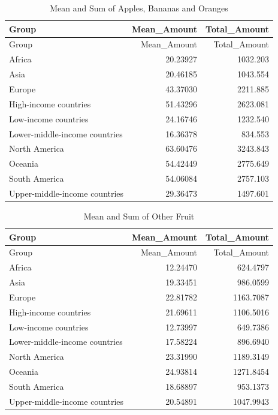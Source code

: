 \documentclass[
]{article}
\begin{document}
\begin{longtable}[]{@{}lrr@{}}
\caption{Mean and Sum of Apples, Bananas and Oranges}\tabularnewline
\toprule\noalign{}
Group & Mean\_Amount & Total\_Amount \\
\midrule\noalign{}
\endfirsthead
\toprule\noalign{}
Group & Mean\_Amount & Total\_Amount \\
\midrule\noalign{}
\endhead
\bottomrule\noalign{}
\endlastfoot
Africa & 20.23927 & 1032.203 \\
Asia & 20.46185 & 1043.554 \\
Europe & 43.37030 & 2211.885 \\
High-income countries & 51.43296 & 2623.081 \\
Low-income countries & 24.16746 & 1232.540 \\
Lower-middle-income countries & 16.36378 & 834.553 \\
North America & 63.60476 & 3243.843 \\
Oceania & 54.42449 & 2775.649 \\
South America & 54.06084 & 2757.103 \\
Upper-middle-income countries & 29.36473 & 1497.601 \\
\end{longtable}

\begin{longtable}[]{@{}lrr@{}}
\caption{Mean and Sum of Other Fruit}\tabularnewline
\toprule\noalign{}
Group & Mean\_Amount & Total\_Amount \\
\midrule\noalign{}
\endfirsthead
\toprule\noalign{}
Group & Mean\_Amount & Total\_Amount \\
\midrule\noalign{}
\endhead
\bottomrule\noalign{}
\endlastfoot
Africa & 12.24470 & 624.4797 \\
Asia & 19.33451 & 986.0599 \\
Europe & 22.81782 & 1163.7087 \\
High-income countries & 21.69611 & 1106.5016 \\
Low-income countries & 12.73997 & 649.7386 \\
Lower-middle-income countries & 17.58224 & 896.6940 \\
North America & 23.31990 & 1189.3149 \\
Oceania & 24.93814 & 1271.8454 \\
South America & 18.68897 & 953.1373 \\
Upper-middle-income countries & 20.54891 & 1047.9943 \\
\end{longtable}
\end{document}
